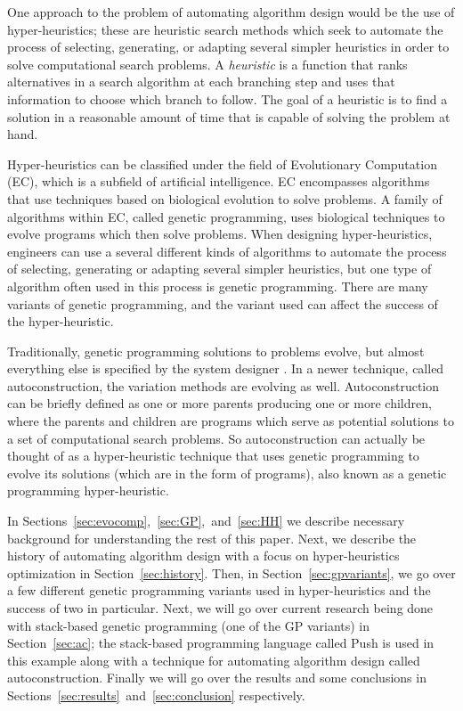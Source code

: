 \documentclass{sig-alternate}
\begin{document}
One approach to the problem of automating algorithm design would be the use of hyper-heuristics; these are heuristic search methods which seek to automate the process of selecting, generating, or adapting several simpler heuristics in order to solve computational search problems. A \textit{heuristic} is a function that ranks alternatives in a search algorithm at each branching step and uses that information to choose which branch to follow. The goal of a heuristic is to find a solution in a reasonable amount of time that is capable of solving the problem at hand.

Hyper-heuristics can be classified under the field of Evolutionary Computation (EC), which is a subfield of artificial intelligence. EC encompasses algorithms that use techniques based on biological evolution to solve problems. A family of algorithms within EC, called genetic programming, uses biological techniques to evolve programs which then solve problems. When designing hyper-heuristics, engineers can use a several different kinds of algorithms to automate the process of selecting, generating or adapting several simpler heuristics, but one type of algorithm often used in this process is genetic programming. There are many variants of genetic programming, and the variant used can affect the success of the hyper-heuristic.

Traditionally, genetic programming solutions to problems evolve, but almost everything else is specified by the system designer \cite{spector:2016}. In a newer technique, called autoconstruction, the variation methods are evolving as well. Autoconstruction can be briefly defined as one or more parents producing one or more children, where the parents and children are programs which serve as potential solutions to a set of computational search problems. So autoconstruction can actually be thought of as a hyper-heuristic technique that uses genetic programming to evolve its solutions (which are in the form of programs), also known as a genetic programming hyper-heuristic.

In Sections~\ref{sec:evocomp},~\ref{sec:GP},~and~\ref{sec:HH} we describe necessary background for understanding the rest of this paper. Next, we describe the history of automating algorithm design with a focus on hyper-heuristics optimization in Section~\ref{sec:history}. Then, in Section~\ref{sec:gpvariants}, we go over a few different genetic programming variants used in hyper-heuristics and the success of two in particular. Next, we will go over current research being done with stack-based genetic programming (one of the GP variants) in Section~\ref{sec:ac}; the stack-based programming language called Push is used in this example along with a technique for automating algorithm design called autoconstruction. Finally we will go over the results and some conclusions in Sections~\ref{sec:results}~and~\ref{sec:conclusion} respectively.
\end{document}
